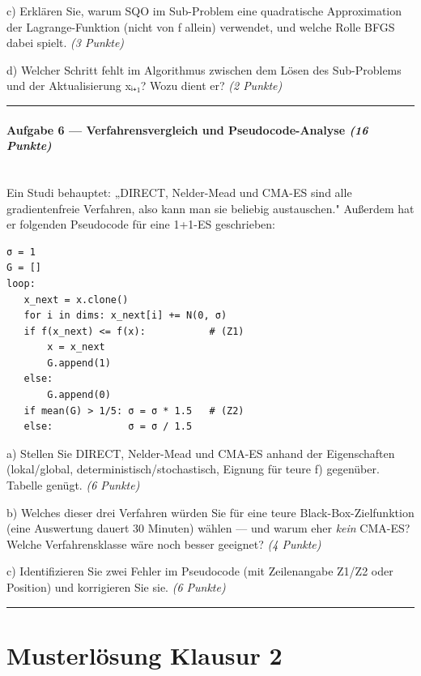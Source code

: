 \documentclass[11pt, a4paper]{article}
\begin{document}
c) Erklären Sie, warum SQO im Sub-Problem eine quadratische Approximation der Lagrange-Funktion (nicht von f allein) verwendet, und welche Rolle BFGS dabei spielt. \textit{(3 Punkte)}


d) Welcher Schritt fehlt im Algorithmus zwischen dem Lösen des Sub-Problems und der Aktualisierung x⃗ᵢ₊₁? Wozu dient er? \textit{(2 Punkte)}



\noindent\textcolor{rulegray}{\rule{\linewidth}{0.4pt}}


\paragraph{Aufgabe 6 — Verfahrensvergleich und Pseudocode-Analyse \textit{(16 Punkte)}}\mbox{}\\[2pt]

Ein Studi behauptet: „DIRECT, Nelder-Mead und CMA-ES sind alle gradientenfreie Verfahren, also kann man sie beliebig austauschen." Außerdem hat er folgenden Pseudocode für eine 1+1-ES geschrieben:


\begin{lstlisting}
σ = 1
G = []
loop:
   x_next = x.clone()
   for i in dims: x_next[i] += N(0, σ)
   if f(x_next) <= f(x):           # (Z1)
       x = x_next
       G.append(1)
   else:
       G.append(0)
   if mean(G) > 1/5: σ = σ * 1.5   # (Z2)
   else:             σ = σ / 1.5
\end{lstlisting}


a) Stellen Sie DIRECT, Nelder-Mead und CMA-ES anhand der Eigenschaften (lokal/global, deterministisch/stochastisch, Eignung für teure f) gegenüber. Tabelle genügt. \textit{(6 Punkte)}


b) Welches dieser drei Verfahren würden Sie für eine teure Black-Box-Zielfunktion (eine Auswertung dauert 30 Minuten) wählen — und warum eher \textit{kein} CMA-ES? Welche Verfahrensklasse wäre noch besser geeignet? \textit{(4 Punkte)}


c) Identifizieren Sie zwei Fehler im Pseudocode (mit Zeilenangabe Z1/Z2 oder Position) und korrigieren Sie sie. \textit{(6 Punkte)}



\noindent\textcolor{rulegray}{\rule{\linewidth}{0.4pt}}



\section{Musterlösung Klausur 2}
\end{document}
